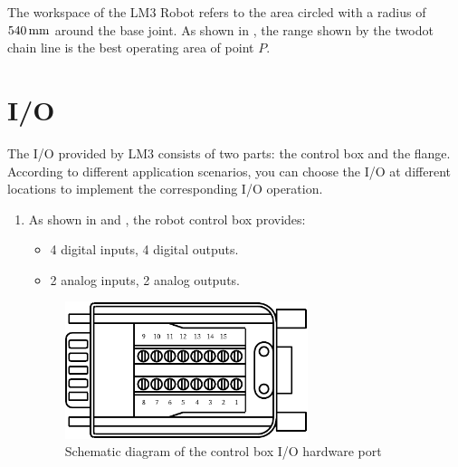 The workspace of the LM3 Robot refers to the area circled with a radius of $540\,\mathrm{mm}$ around the base joint. As shown in , the range shown by the two­dot chain line is the best operating area of point $\!P\!$.

\clearpage

\section{I/O}

The I/O provided by LM3 consists of two parts: the control box and the flange. According to different application scenarios, you can choose the I/O at different locations to implement the corresponding I/O operation.


\begin{enumerate}
    \item As shown in  and , the robot control box provides:
    \begin{itemize}
        \item 4 digital inputs, 4 digital outputs.
        \item 2 analog inputs, 2 analog outputs.
    \end{itemize}

\begin{figure}[htb!]
    \centering
    \includegraphics[height=4cm]{en/image/robot_box_io_plugin.pdf}
    \caption{Schematic diagram of the control box I/O hardware port}
    \label{fig:控制箱IO}
\end{figure}




\end{enumerate}

